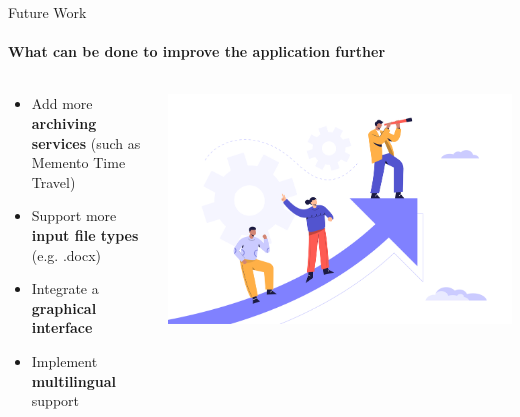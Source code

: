 \documentclass[
    ngerman,%
    authorontitle=true,
]{bfhbeamer}
\begin{document}
    \begin{frame}{Future Work}
        \framesubtitle{What can be done to improve the application further}
        \begin{columns} %
            \begin{column}{0.5\textwidth} %
                \begin{itemize}
                    \item Add more \textbf{archiving services} (such as Memento Time Travel)
                    \item Support more \textbf{input file types} (e.g. .docx)
                    \item Integrate a \textbf{graphical interface}
                    \item Implement \textbf{multilingual} support
                \end{itemize}
            \end{column}
            \begin{column}{0.3\textwidth} %
                \begin{center}
                    \includegraphics[width=1\textwidth]{pictures/final_presentation/Business_team_2.jpg}
                \end{center}
            \end{column}
        \end{columns}
    \end{frame}
\end{document}

